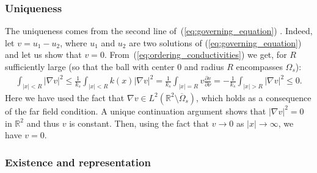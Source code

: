 \subsubsection{Uniqueness}

The uniqueness comes from the second line
of~(\ref{eq:governing_equation}) \cite{ammari2007polarization}.
Indeed, let $v=u_1-u_2$, where $u_1$ and $u_2$ are two solutions
of (\ref{eq:governing_equation}) and let us show that $v=0$.
From~(\ref{eq:ordering_conductivities}) we get, for $R$
sufficiently large (so that the ball with center $0$ and radius
$R$ encompasses $\Omega_s$):
\begin{align*}
\int_{\left|x\right|<R}\left|\nabla v\right|^{2}
\leq\frac{1}{k_{s}} \int_{\left|x\right|<R} k(x) \left|\nabla
v\right|^{2} =
 \frac{1}{k_{s}}\int_{\left|x\right|=R}v\frac{\partial v}{\partial\nu}=
 -\frac{1}{k_{s}}\int_{\left|x\right|>R}\left|\nabla
v\right|^{2}\leq0.
\end{align*}
Here we have used the fact that  $\nabla v \in
L^2(\mathbb{R}^{2}\setminus \overline{\Omega}_s)$, which holds as
a consequence of the far field condition.
 A unique continuation argument shows that
$\left|\nabla v\right|^{2}=0$ in $\mathbb{R}^{2}$ and thus $v$ is
constant. Then, using the fact that $v\rightarrow0$ as
$|x|\rightarrow \infty$, we have $v=0$.


\subsubsection{Existence and representation}

